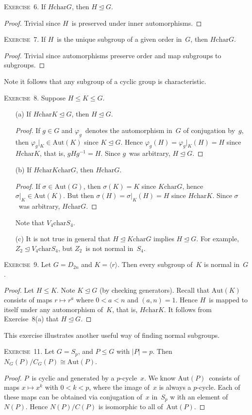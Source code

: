 \documentclass[letterpaper]{article}
\newcommand{\exercise}[1]{\goodbreak\noindent\textsc{Exercise~{#1}.}}
\newcommand{\iso}{\cong}
\newcommand{\subgroup}{\le}
\newcommand{\normal}{\trianglelefteq}
\newcommand{\aut}{\mathrm{Aut}}
\newcommand{\chr}{\mathrel{\mathrm{char}}}
\newcommand{\ord}[1]{|{#1}|}
\newcommand{\gen}[1]{\langle{#1}\rangle}
\begin{document}
\bigskip
\exercise{6}
If $H\chr G$, then $H\normal G$.
\begin{proof}
Trivial since $H$~is preserved under inner automorphisms.
\end{proof}

\exercise{7}
If $H$~is the unique subgroup of a given order in~$G$, then $H\chr G$.
\begin{proof}
Trivial since automorphisms preserve order and map subgroups to subgroups.
\end{proof}
\noindent Note it follows that any subgroup of a cyclic group is characteristic.

\bigskip
\exercise{8}
Suppose $H\subgroup K\subgroup G$.
\begin{enumerate}[itemsep=0pt]
\item[(a)] If $H\chr K\normal G$, then $H\normal G$. 
\begin{proof}
If $g\in G$ and $\varphi_g$~denotes the automorphism in~$G$ of conjugation by~$g$, then $\varphi_g|_K\in\aut(K)$ since $K\normal G$. Hence $\varphi_g(H)=\varphi_g|_K(H)=H$ since $H\chr K$, that is, $gHg^{-1}=H$. Since $g$~was arbitrary, $H\normal G$.
\end{proof}
\item[(b)] If $H\chr K\chr G$, then $H\chr G$.
\begin{proof}
If $\sigma\in\aut(G)$, then $\sigma(K)=K$ since $K\chr G$, hence $\sigma|_K\in\aut(K)$. But	then $\sigma(H)=\sigma|_K(H)=H$ since $H\chr K$. Since $\sigma$~was arbitrary, $H\chr G$.
\end{proof}
\noindent Note that $V_4\chr S_4$.
\item[(c)] It is not true in general that $H\normal K\chr G$ implies $H\normal G$. For example, $Z_2\normal V_4\chr S_4$, but $Z_2$~is not normal in~$S_4$.
\end{enumerate}

\exercise{9}
Let $G=D_{2n}$ and $K=\gen{r}$. Then every subgroup of~$K$ is normal in~$G$.
\begin{proof}
Let $H\subgroup K$. Note $K\normal G$ (by checking generators). Recall that $\aut(K)$ consists of maps $r\mapsto r^a$ where $0<a<n$ and $(a,n)=1$. Hence $H$~is mapped to itself under any automorphism of~$K$, that is, $H\chr K$. It follows from Exercise~8(a) that $H\normal G$.
\end{proof}
\noindent This exercise illustrates another useful way of finding normal subgroups.

\bigskip
\exercise{11}
Let $G=S_p$, and $P\subgroup G$ with $\ord{P}=p$. Then $N_G(P)/C_G(P)\iso\aut(P)$.
\begin{proof}
$P$~is cyclic and generated by a $p$-cycle~$x$. We know $\aut(P)$~consists of maps $x\mapsto x^k$ with $0<k<p$, where the image of~$x$ is always a $p$-cycle. Each of these maps can be obtained via conjugation of~$x$ in~$S_p$ w ith an element of~$N(P)$. Hence $N(P)/C(P)$ is isomorphic to all of~$\aut(P)$.
\end{proof}
\end{document}
